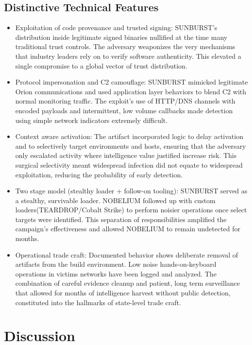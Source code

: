 \documentclass[conference]{IEEEtran}
\begin{document}
\subsection{Distinctive Technical Features}
\begin{itemize}
    \item Exploitation of code provenance and trusted signing: SUNBURST's distribution inside legitimate signed binaries nullified at the time many traditional
    trust controls. The adversary weaponizes the very mechanisms that industry leaders rely on to verify software authenticity. This elevated a single compromise to a global vector of trust distribution.
    \item Protocol impersonation and C2 camouflage: SUNBURST mimicked legitimate Orion communications and used application layer behaviors to blend  C2 with normal monitoring traffic.
    The exploit's use of HTTP/DNS channels with encoded payloads and intermittent, low volume callbacks made detection using simple network indicators extremely difficult.
    \item Context aware activation: The artifact incorporated logic to delay activation and to selectively target environments and hosts, ensuring that the adversary only escalated activity
    where intelligence value justified increase risk. This surgical selectivity meant widespread infection did not equate to widespread exploitation, reducing the probability of early detection.
    \item Two stage model (stealthy loader + follow-on tooling): SUNBURST served as a stealthy, survivable loader. NOBELIUM followed up with custom
    loaders(TEARDROP/Cobalt Strike) to perform noisier operations once select targets were identified\cite{MicrosoftDeepDiveSOLORIGATE}. This separation
    of responsibilities amplified the campaign's effectiveness and allowed NOBELIUM to remain undetected for months.
    \item Operational trade craft: Documented behavior shows deliberate removal of artifacts from the build environment. Low noise hands-on-keyboard 
    operations in victims networks have been logged and analyzed. The combination of careful evidence cleanup and patient, long term
    surveillance that allowed for months of intelligence harvest without public detection, constituted into the hallmarks of state-level trade craft. 
\end{itemize}




\section*{Discussion}
\end{document}
